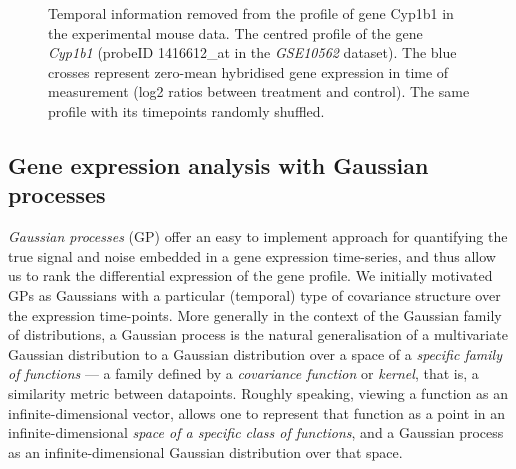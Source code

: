     \begin{figure}[!htbp]
      \begin{center}
	\leavevmode
	\label{fig:profile_combined}
	\caption[Disregarding temporal information in a gene expression profile.] {
	  Temporal information removed from the profile of gene Cyp1b1 in the experimental mouse data.
	  \textbf{} The centred profile of the gene \textit{Cyp1b1} (probeID
	  1416612\_at in the \textit{GSE10562} dataset). The blue crosses
	  represent zero-mean hybridised gene expression in time of measurement
	  (log2 ratios between treatment and control).
	  \textbf{} The same profile with its timepoints randomly shuffled.
	}
	\label{fig:profile}
      \end{center}
    \end{figure}

  \subsection{Gene expression analysis with Gaussian processes}
    \textit{Gaussian processes} (GP) \citep{Rasmussen:book06, MacKay:book03} offer an easy to implement approach for quantifying the true signal and noise embedded in a gene expression time-series, and thus allow us to rank the differential expression of the gene profile.
    We initially motivated GPs as Gaussians with a particular (temporal) type of covariance structure over the expression time-points.
    More generally in the context of the Gaussian family of distributions, a Gaussian process is the natural generalisation of a multivariate Gaussian distribution to a Gaussian distribution over a space of a \textit{specific family of functions} --- a family defined by a \textit{covariance function} or \textit{kernel}, that is, a similarity metric between datapoints.
    Roughly speaking, viewing a function as an infinite-dimensional vector, allows one to represent that function as a point in an infinite-dimensional \textit{space of a specific class of functions}, and a Gaussian process as an infinite-dimensional Gaussian distribution over that space.


